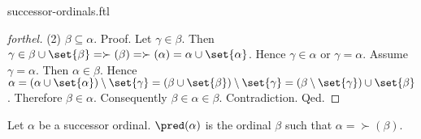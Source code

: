 \documentclass{naproche-library}
\begin{document}
\begin{smodule}[title=Successor Ordinals]{successor-ordinals.ftl}
\begin{proof}[forthel]
  (2) $\beta \subseteq \alpha$. \newline
  Proof.
    Let $\gamma \in \beta$.
    Then $\gamma \in \beta \cup \set{\beta}
      = \succ(\beta)
      = \succ(\alpha)
      = \alpha \cup \set{\alpha}$.
    Hence $\gamma \in \alpha$ or $\gamma = \alpha$.
    Assume $\gamma = \alpha$.
    Then $\alpha \in \beta$.
    Hence $\alpha
      = (\alpha \cup \set{\alpha}) \setminus \set{\gamma}
      = (\beta \cup \set{\beta}) \setminus \set{\gamma}
      = (\beta \setminus \set{\gamma}) \cup \set{\beta}$.
    Therefore $\beta \in \alpha$.
    Consequently $\beta \in \alpha \in \beta$.
    Contradiction.
  Qed.
\end{proof}

\begin{definition}[forthel,id=SET_THEORY_02_735071524880384]
  Let $\alpha$ be a successor ordinal.
  $\pred(\alpha)$ is the ordinal $\beta$ such that $\alpha = \succ(\beta)$.
\end{definition}
\end{smodule}
\end{document}
